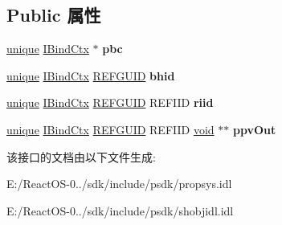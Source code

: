 \subsection*{Public 属性}
\begin{DoxyCompactItemize}
\item 
\mbox{\label{interfacev1__enum_aeb3a94c055da608b6ac25fecd64d1384}} 
\hyperlink{interfaceunique}{unique} \hyperlink{interface_i_bind_ctx}{I\+Bind\+Ctx} $\ast$ {\bfseries pbc}
\item 
\mbox{\label{interfacev1__enum_ac03af8eabb0d48567ae96cef36095567}} 
\hyperlink{interfaceunique}{unique} \hyperlink{interface_i_bind_ctx}{I\+Bind\+Ctx} \hyperlink{struct___g_u_i_d}{R\+E\+F\+G\+U\+ID} {\bfseries bhid}
\item 
\mbox{\label{interfacev1__enum_a2d3e2555b19fc505f516f8d0b8243ced}} 
\hyperlink{interfaceunique}{unique} \hyperlink{interface_i_bind_ctx}{I\+Bind\+Ctx} \hyperlink{struct___g_u_i_d}{R\+E\+F\+G\+U\+ID} R\+E\+F\+I\+ID {\bfseries riid}
\item 
\mbox{\label{interfacev1__enum_aacc83ad52d70acb79e088246e9699f48}} 
\hyperlink{interfaceunique}{unique} \hyperlink{interface_i_bind_ctx}{I\+Bind\+Ctx} \hyperlink{struct___g_u_i_d}{R\+E\+F\+G\+U\+ID} R\+E\+F\+I\+ID \hyperlink{interfacevoid}{void} $\ast$$\ast$ {\bfseries ppv\+Out}
\end{DoxyCompactItemize}


该接口的文档由以下文件生成\+:\begin{DoxyCompactItemize}
\item 
E\+:/\+React\+O\+S-\/0../sdk/include/psdk/propsys.\+idl\item 
E\+:/\+React\+O\+S-\/0../sdk/include/psdk/shobjidl.\+idl\end{DoxyCompactItemize}
